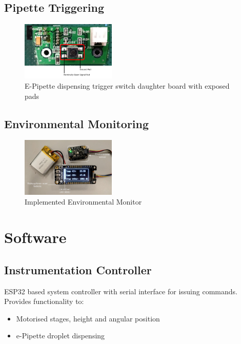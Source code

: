 \subsection{Pipette Triggering}

\begin{figure}[h]
    \centering
    \includegraphics[width=0.4\textwidth]{img/trig_brd.png}
    \caption{E-Pipette dispensing trigger switch daughter board with exposed pads}
\end{figure}

\subsection{Environmental Monitoring}

\begin{figure}[h]
    \centering
    \includegraphics[width=0.4\textwidth]{img/env_mon.png}
    \caption{Implemented Environmental Monitor}
\end{figure}

\section{Software}


\subsection{Instrumentation Controller}
ESP32 based system controller with serial interface for issuing commands. Provides functionality to:
\begin{itemize}
    \item Motorised stages, height and angular position
    \item e-Pipette droplet dispensing
\end{itemize}

